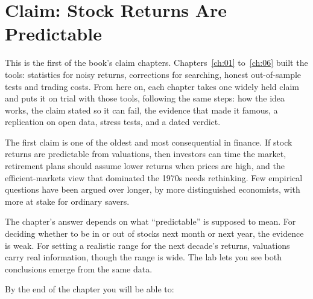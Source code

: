 \makeatletter
{}
\makeatother

\chapter{Claim: Stock Returns Are Predictable}
\label{ch:07}

This is the first of the book's claim chapters. Chapters~\ref{ch:01} to~\ref{ch:06} built the tools: statistics for noisy returns, corrections for searching, honest out-of-sample tests and trading costs. From here on, each chapter takes one widely held claim and puts it on trial with those tools, following the same steps: how the idea works, the claim stated so it can fail, the evidence that made it famous, a replication on open data, stress tests, and a dated verdict.

The first claim is one of the oldest and most consequential in finance. If stock returns are predictable from valuations, then investors can time the market, retirement plans should assume lower returns when prices are high, and the efficient-markets view that dominated the 1970s needs rethinking. Few empirical questions have been argued over longer, by more distinguished economists, with more at stake for ordinary savers.

The chapter's answer depends on what ``predictable'' is supposed to mean. For deciding whether to be in or out of stocks next month or next year, the evidence is weak. For setting a realistic range for the next decade's returns, valuations carry real information, though the range is wide. The lab lets you see both conclusions emerge from the same data.

By the end of the chapter you will be able to:

